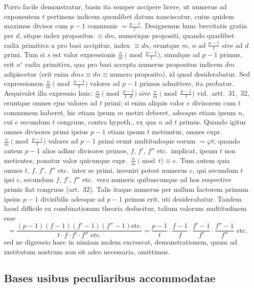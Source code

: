 \documentclass[12pt,a4paper]{article}
\theoremstyle{plain}
\theoremstyle{definition}
\theoremstyle{remark}
\begin{document}
Porro facile demonstratur, basin ita semper accipere licere, ut numerus ad exponentem $t$ pertinens indicem quemlibet datum nanciscatur, cuius quidem maximus divisor cum $p-1$ communis $= \frac{p-1}{t}$. Designemus hunc brevitatis gratia per $d$, sitque index propositus $\equiv dm$, numerique propositi, quando quaelibet radix primitiva $a$ pro basi accipitur, index $\equiv dn$, eruntque $m$, $n$ ad $\frac{p-1}{t}$ sive ad $d$ primi. Tum si $s$ est valor expressionis $\frac{n}{m} \pmod{\frac{p-1}{t}}$, simulque ad $p-1$ primus, erit $a^s$ radix primitiva, qua pro basi accepta numerus propositus indicem $dm$ adipiscetur (erit enim $dms \equiv dn \equiv \text{numero proposito}$), id quod desiderabatur. Sed expressionem $\frac{n}{m} \pmod{\frac{p-1}{t}}$ valores ad $p-1$ primos admittere, ita probatur. Aequivalet illa expressio huic: $\frac{n}{m} \pmod{\frac{p-1}{t \cdot d}}$ sive $\frac{n}{m} \pmod{\frac{p-1}{t}}$ vid.\ artt.~31,~32, eruntque omnes ejus valores ad $t$ primi; si enim aliquis valor $e$ divisorem cum $t$ communem haberet, hic etiam ipsum $m$ metiri deberet, adeoque etiam ipsum $n$, cui $e$ secundum $t$ congruus, contra hypoth., ex qua $n$ ad $t$ primus. Quando igitur omnes divisores primi ipsius $p-1$ etiam ipsum $t$ metiuntur, omnes expr.\ $\frac{n}{m} \pmod{\frac{p-1}{t}}$ valores ad $p-1$ primi erunt multitudoque eorum $= \varphi t$; quando autem $p-1$ alios adhuc divisores primos, $f$, $f'$, $f''$ etc.\ implicat, ipsum $t$ non metientes, ponatur valor quicunque expr.\ $\frac{n}{m} \pmod{t} \equiv e$. Tum autem quia omnes $t$, $f$, $f'$, $f''$ etc.\ inter se primi, inveniri potest numerus $e$, qui secundum $t$ ipsi $e$, secundum $f$, $f'$, $f''$ etc.\ vero numeris quibuscunque ad hos respective primis fiat congruus (art.~32). Talis itaque numerus per nullum factorem primum ipsius $p-1$ divisibilis adeoque ad $p-1$ primus erit, uti desiderabatur. Tandem haud difficile ex combinationum theoria deducitur, talium valorum multitudinem esse
\[
= \frac{(p-1)(f-1)(f'-1)(f''-1)\text{etc.}}{t \cdot f \cdot f' \cdot f'' \text{ etc.}} = \frac{p-1}{t} \cdot \frac{f-1}{f} \cdot \frac{f'-1}{f'} \cdot \frac{f''-1}{f''} \text{ etc.}
\]
sed ne digressio haec in nimiam molem excrescat, demonstrationem, quum ad institutum nostrum non sit adeo necessaria, omittimus.

\subsection*{Bases usibus peculiaribus accommodatae}
\end{document}
